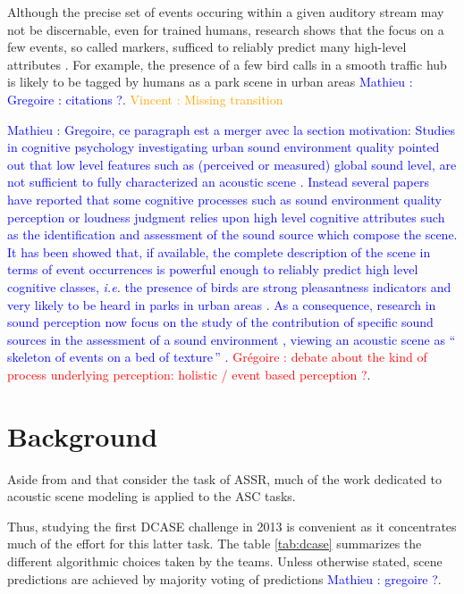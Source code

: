 \documentclass[journal]{IEEEtran}
\newcommand{\vl}[1]{\textcolor{orange}{Vincent : #1}}
\newcommand{\gl}[1]{\textcolor{red}{Gr\'egoire : #1}}
\newcommand{\ml}[1]{\textcolor{blue}{ Mathieu : #1}}
\begin{document}
Although the precise set of events occuring within a given auditory stream may not be discernable, even for trained humans, research shows that the focus on a few events, so called markers,  sufficed to reliably predict many high-level attributes \cite{lafayPartI}.
For example, the presence of a few bird calls in a smooth traffic hub is likely to be tagged by humans as a park scene in urban areas \ml{Gregoire : citations ?}.
\vl{Missing transition}


\ml{Gregoire, ce paragraph est a merger avec la section motivation: Studies in cognitive psychology investigating urban sound environment quality pointed out that low level features such as (perceived or measured) global sound level, are not sufficient to fully characterized an acoustic scene \cite{guyot2005urban,kang2006urban}. Instead several papers have reported that some cognitive processes such as sound environment quality perception \cite{dubois2006cognitive} or loudness judgment \cite{kuwano_memory_2003}  relies upon high level cognitive attributes such as the identification and assessment of the sound source which compose the scene. It has been showed that, if available, the complete description of the scene in terms of event occurrences is powerful enough to reliably predict high level cognitive classes, \textit{i.e.} the presence of birds are strong pleasantness indicators and very likely to be heard in parks in urban areas \cite{lafay:hal-01111782}. As a consequence, research in sound perception now focus on the study of the contribution of specific sound sources in the assessment of a sound environment \cite{ricciardi2015sound,lavandier2006contribution}, viewing an acoustic scene as ``\,skeleton of events on a bed of texture\,''  \cite{nelken_ear_2013}. \gl{debate about the kind of process underlying perception: holistic / event based perception ?}}. 



\section{Background} \label{sec:soa}

Aside from \cite{aucouturier2007bag} and \cite{lagrange:hal-01082501} that consider the task of ASSR, much of the work dedicated to acoustic scene modeling is applied to the ASC tasks.

Thus, studying the first DCASE challenge \cite{barchiesi2015acoustic} in 2013 is convenient as it concentrates much of the effort for this latter task. The table \ref{tab:dcase} summarizes the different algorithmic choices taken by the teams. Unless otherwise stated, scene predictions are achieved by majority voting of predictions \ml{gregoire ?}.
\end{document}
